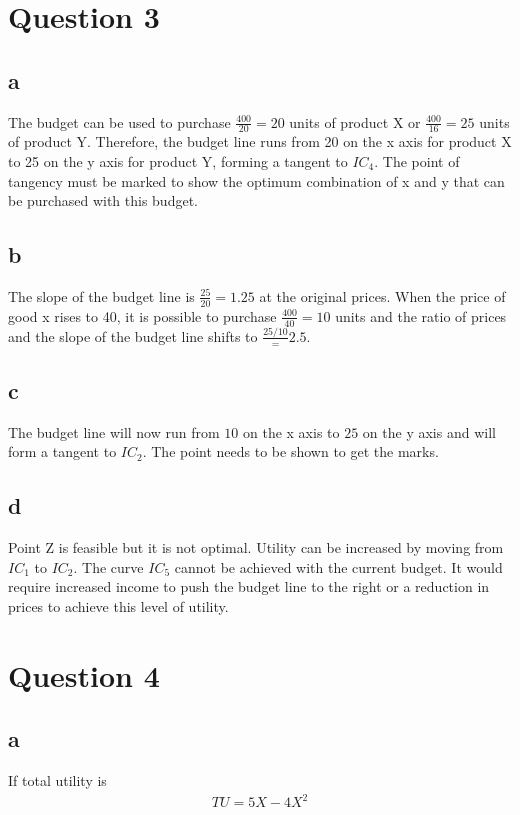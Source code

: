 \documentclass[12pt, a4paper, oneside]{article}\usepackage[]{graphicx}\usepackage[]{color}
\begin{document}
\section*{Question 3}
\subsection*{a}
The budget can be used to purchase $\frac{400}{20} = 20$ units of product X or $\frac{400}{16} = 25$ units of product Y.  Therefore, the budget line runs from 20 on the x axis for product X to 25 on the y axis for product Y, forming a tangent to $IC_4$.  The point of tangency must be marked to show the optimum combination of x and y that can be purchased with this budget. 

\subsection*{b}
The slope of the budget line is $\frac{25}{20} = 1.25$ at the original prices.  When the price of good x rises to 40, it is possible to purchase $\frac{400}{40} = 10$ units and the ratio of prices and the slope of the budget line shifts to $\frac{25/10} = 2.5$.  

\subsection*{c}
The budget line will now run from $10$ on the x axis to $25$ on the y axis and will form a tangent to $IC_2$.  The point needs to be shown to get the marks.

\subsection*{d}
Point Z is feasible but it is not optimal.  Utility can be increased by moving from $IC_1$ to $IC_2$.  The curve $IC_5$ cannot be achieved with the current budget.  It would require increased income to push the budget line to the right or a reduction in prices to achieve this level of utility. 

\section*{Question 4}
\subsection*{a}
If total utility is
\begin{align*}
TU = 5X - 4X^2
\end{align*}
\end{document}
